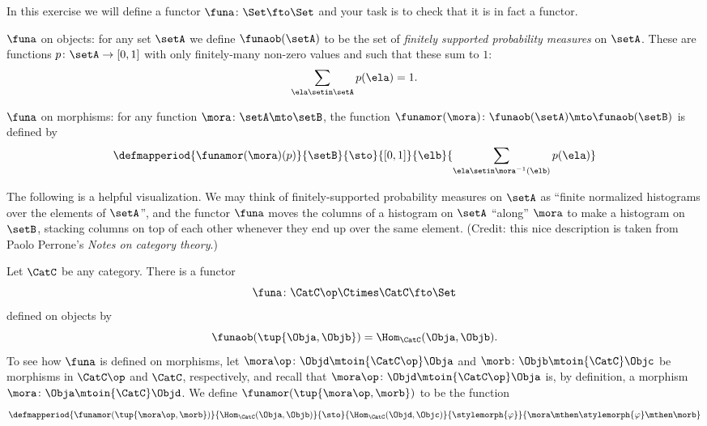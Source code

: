 \begin{gradedexercise}
    \label{ex:probability-functor}

    In this exercise we will define a functor $\funa \colon \Set \fto \Set$ and your task is to check that it is in fact a functor.

    $\funa$ on objects: for any set $\setA$ we define $\funaob(\setA)$ to be the set of \emph{finitely supported probability measures} on $\setA$.
    These are functions $p \colon \setA \to [0,1]$ with only finitely-many non-zero values and such that these sum to $1$:
    \begin{equation}\label{eq:probability-measure}
        \sum_{\ela \setin \setA} p(\ela) = 1.
    \end{equation}

    $\funa$ on morphisms: for any function $\mora \colon \setA \mto \setB$, the function $\funamor(\mora) \colon \funaob(\setA) \mto \funaob(\setB)$ is defined by
    \begin{equation}
        \defmapperiod{\funamor(\mora)(p)}{\setB}{\sto}{[0,1]}{\elb}{\sum_{\ela \setin \mora^{-1}(\elb)} p(\ela)}
    \end{equation}

    The following is a helpful visualization.
    We may think of finitely-supported probability measures on $\setA$ as ``finite normalized histograms over the elements of $\setA$'', and the functor $\funa$ moves the columns of a histogram on $\setA$ ``along'' $\mora$ to make a histogram on $\setB$, stacking columns on top of each other whenever they end up over the same element.
    (Credit: this nice description is taken from Paolo Perrone's \emph{Notes on category theory}.)
\end{gradedexercise}


\begin{example}\label{exa:hom-functor}
    Let $\CatC$ be any category.
    There is a functor
    \begin{equation}\label{eq:hom-functor-type}
        \funa \colon \CatC\op \Ctimes \CatC \fto \Set
    \end{equation}
    defined on objects by
    \begin{equation}\label{eq:hom-functor-on-objects}
        \funaob(\tup{\Obja, \Objb}) = \Hom_\CatC(\Obja, \Objb).
    \end{equation}
    To see how $\funa$ is defined on morphisms, let $\mora\op \colon \Objd \mtoin{\CatC\op} \Obja$ and $\morb \colon \Objb \mtoin{\CatC} \Objc$ be morphisms in $\CatC\op$ and $\CatC$, respectively, and recall that $\mora\op \colon \Objd \mtoin{\CatC\op} \Obja$ is, by definition, a morphism $\mora \colon \Obja \mtoin{\CatC} \Objd$.
    We define $\funamor(\tup{\mora\op, \morb})$ to be the function
    \begin{equation}\label{eq:hom-functor-on-morphisms}
        \defmapperiod{\funamor(\tup{\mora\op, \morb})}{\Hom_\CatC(\Obja, \Objb)}{\sto}{\Hom_\CatC(\Objd, \Objc)}{\stylemorph{\varphi}}{\mora \mthen \stylemorph{\varphi} \mthen \morb}
    \end{equation}

\end{example}

